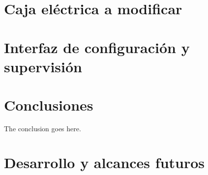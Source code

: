 \documentclass[conference]{IEEEtran}
\begin{document}
\section{Caja eléctrica a modificar}


\section{Interfaz de configuración y supervisión}


\section{Conclusiones}
The conclusion goes here.


\section{Desarrollo y alcances futuros}


\section*{}

\end{document}
